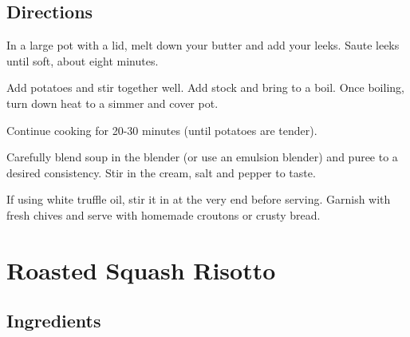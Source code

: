 \documentclass[letterpaper,10pt,english]{sphinxmanual}
\begin{document}
\section{Directions}
\label{\detokenize{Potato_Leek_Soup:directions}}
In a large pot with a lid, melt down your butter and add your leeks. Saute leeks until soft, about eight minutes.

Add potatoes and stir together well. Add stock and bring to a boil. Once boiling, turn down heat to a simmer and cover pot.

Continue cooking for 20-30 minutes (until potatoes are tender).

Carefully blend soup in the blender (or use an emulsion blender) and puree to a desired consistency. Stir in the cream, salt and pepper to taste.

If using white truffle oil, stir it in at the very end before serving. Garnish with fresh chives and serve with homemade croutons or crusty bread.


\chapter{Roasted Squash Risotto}
\label{\detokenize{RSRisotto:roasted-squash-risotto}}\label{\detokenize{RSRisotto::doc}}


\section{Ingredients}
\label{\detokenize{RSRisotto:ingredients}}
%
\begin{sphinxVerbatim}[commandchars=\\\{\}]
     

   

   

   

         

   

   

   

    

   

       

   
\end{sphinxVerbatim}
\end{document}
